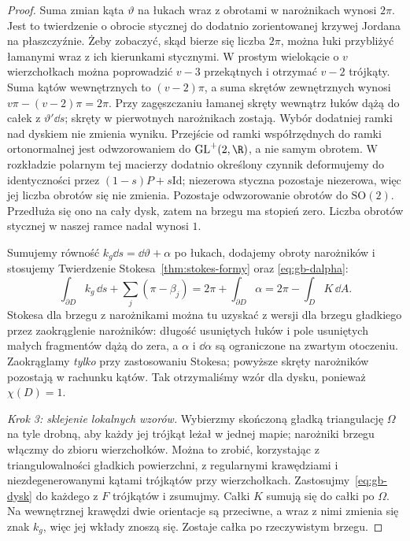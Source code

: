 \begin{proof}
Suma zmian kąta $\vartheta$ na łukach wraz z obrotami
w narożnikach wynosi $2\pi$. Jest to twierdzenie o
obrocie stycznej do dodatnio zorientowanej krzywej
Jordana na płaszczyźnie. Żeby zobaczyć, skąd bierze się
liczba $2\pi$, można łuki przybliżyć łamanymi wraz z
ich kierunkami stycznymi. W prostym wielokącie o $v$
wierzchołkach można poprowadzić $v-3$ przekątnych
i otrzymać $v-2$ trójkąty. Suma kątów wewnętrznych
to $(v-2)\pi$, a suma skrętów zewnętrznych wynosi
$v\pi-(v-2)\pi=2\pi$. Przy zagęszczaniu łamanej skręty
wewnątrz łuków dążą do całek z $\vartheta'\dd s$;
skręty w pierwotnych narożnikach zostają. Wybór
dodatniej ramki nad dyskiem nie zmienia wyniku. Przejście
od ramki współrzędnych do ramki ortonormalnej jest odwzorowaniem
do $\mathrm{GL}^+(2,\R)$, a nie samym obrotem. W rozkładzie
polarnym tej macierzy dodatnio określony czynnik deformujemy
do identyczności przez $(1-s)P+s\mathrm{Id}$; niezerowa
styczna pozostaje niezerowa, więc jej liczba obrotów się
nie zmienia. Pozostaje odwzorowanie obrotów do $\mathrm{SO}(2)$.
Przedłuża się ono na cały dysk, zatem na brzegu ma stopień
zero. Liczba obrotów stycznej w naszej ramce nadal wynosi $1$.

Sumujemy równość $k_g\dd s=\dd\vartheta+\alpha$
po łukach, dodajemy obroty narożników i stosujemy
Twierdzenie Stokesa~\ref{thm:stokes-formy} oraz
\eqref{eq:gb-dalpha}:
\begin{equation}\label{eq:gb-dysk}
 \int_{\partial D}k_g\,\dd s
 +\sum_j(\pi-\beta_j)
 =2\pi+\int_{\partial D}\alpha
 =2\pi-\int_D K\,\dd A.
\end{equation}
Stokesa dla brzegu z narożnikami można tu uzyskać
z wersji dla brzegu gładkiego przez zaokrąglenie
narożników: długość usuniętych łuków i pole usuniętych
małych fragmentów dążą do zera, a $\alpha$ i $\dd\alpha$
są ograniczone na zwartym otoczeniu. Zaokrąglamy
\emph{tylko} przy zastosowaniu Stokesa; powyższe
skręty narożników pozostają w rachunku kątów.
Tak otrzymaliśmy wzór dla dysku, ponieważ $\chi(D)=1$.

\emph{Krok 3: sklejenie lokalnych wzorów.}
Wybierzmy skończoną gładką triangulację $\Omega$ na tyle
drobną, aby każdy jej trójkąt leżał w jednej mapie;
narożniki brzegu włączmy do zbioru wierzchołków.
Można to zrobić, korzystając z triangulowalności
gładkich powierzchni, z regularnymi krawędziami i
niezdegenerowanymi kątami trójkątów przy wierzchołkach. Zastosujmy~\eqref{eq:gb-dysk}
do każdego z $F$ trójkątów i zsumujmy. Całki $K$
sumują się do całki po $\Omega$. Na wewnętrznej
krawędzi dwie orientacje są przeciwne, a wraz z nimi
zmienia się znak $k_g$, więc jej wkłady znoszą się.
Zostaje całka po rzeczywistym brzegu.


\end{proof}
